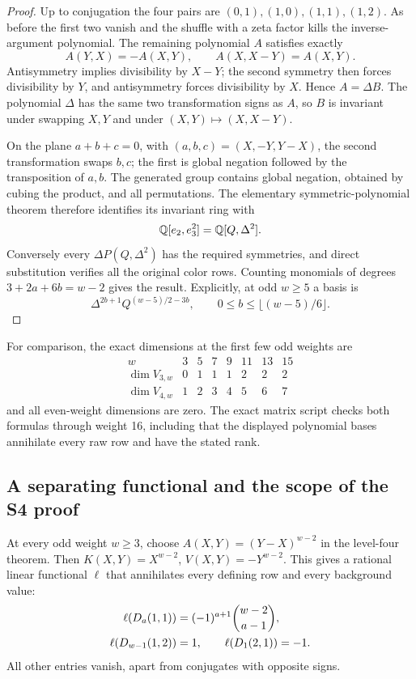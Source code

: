\begin{proof}
Up to conjugation the four pairs are
\((0,1),(1,0),(1,1),(1,2)\).
As before the first two vanish and the shuffle with a zeta factor kills
the inverse-argument polynomial. The remaining polynomial \(A\)
satisfies exactly
\[
 A(Y,X)=-A(X,Y),\qquad A(X,X-Y)=A(X,Y).
\]
Antisymmetry implies divisibility by \(X-Y\); the second symmetry then
forces divisibility by \(Y\), and antisymmetry forces divisibility by
\(X\). Hence \(A=\Delta B\). The polynomial \(\Delta\) has the same
two transformation signs as \(A\), so \(B\) is invariant under swapping
\(X,Y\) and under \((X,Y)\mapsto(X,X-Y)\).

On the plane \(a+b+c=0\), with
\((a,b,c)=(X,-Y,Y-X)\), the second transformation swaps \(b,c\);
the first is global negation followed by the transposition of \(a,b\).
The generated group contains global negation, obtained by cubing
the product, and all permutations. The elementary symmetric-polynomial
theorem therefore identifies its invariant ring with
\[
 \mathbb{Q}[e_2,e_3^2]=\mathbb{Q}[Q,\Delta^2].
\]
Conversely every \(\Delta P(Q,\Delta^2)\) has the required symmetries,
and direct substitution verifies all the original color rows.
Counting monomials of degrees \(3+2a+6b=w-2\) gives the result.
Explicitly, at odd \(w\geq5\) a basis is
\[
 \Delta^{2b+1}Q^{(w-5)/2-3b},
 \qquad 0\leq b\leq\lfloor(w-5)/6\rfloor .
\]
\end{proof}

For comparison, the exact dimensions at the first few odd weights are
\[
\begin{array}{c|rrrrrrr}
 w&3&5&7&9&11&13&15\\ \hline
 \dim V_{3,w}&0&1&1&1&2&2&2\\
 \dim V_{4,w}&1&2&3&4&5&6&7
\end{array}
\]
and all even-weight dimensions are zero. The exact matrix script
checks both formulas through weight 16, including that the displayed
polynomial bases annihilate every raw row and have the stated rank.

\subsection{A separating functional and the scope of the S4 proof}

At every odd weight \(w\geq3\), choose
\(A(X,Y)=(Y-X)^{w-2}\) in the level-four theorem.
Then \(K(X,Y)=X^{w-2}\), \(V(X,Y)=-Y^{w-2}\).
This gives a rational linear functional \(\ell\) that annihilates every
defining row and every background value:
\begin{align}
 \ell(D_a(1,1))&=(-1)^{a+1}\binom{w-2}{a-1},\notag\\
 \ell(D_{w-1}(1,2))&=1,\qquad
 \ell(D_1(2,1))=-1. \label{cycloquot:eq:separating}
\end{align}
All other entries vanish, apart from conjugates with opposite signs.

